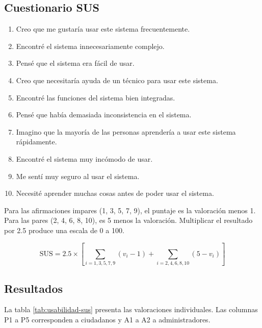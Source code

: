\subsection{Cuestionario SUS}

\begin{enumerate}[label=\textbf{\arabic*}.]
    \item Creo que me gustaría usar este sistema frecuentemente.
    \item Encontré el sistema innecesariamente complejo.
    \item Pensé que el sistema era fácil de usar.
    \item Creo que necesitaría ayuda de un técnico para usar este sistema.
    \item Encontré las funciones del sistema bien integradas.
    \item Pensé que había demasiada inconsistencia en el sistema.
    \item Imagino que la mayoría de las personas aprendería a usar este sistema rápidamente.
    \item Encontré el sistema muy incómodo de usar.
    \item Me sentí muy seguro al usar el sistema.
    \item Necesité aprender muchas cosas antes de poder usar el sistema.
\end{enumerate}

Para las afirmaciones impares (1, 3, 5, 7, 9), el puntaje es la valoración menos 1. Para las pares (2, 4, 6, 8, 10), es 5 menos la valoración. 
Multiplicar el resultado por 2.5 produce una escala de 0 a 100.

\[
\text{SUS} = 2.5 \times \left[ \sum_{i=1,3,5,7,9} (v_i - 1) + \sum_{i=2,4,6,8,10} (5 - v_i) \right]
\]

\subsection{Resultados}

La tabla \ref{tab:usabilidad-sus} presenta las valoraciones individuales. Las columnas P1 a P5 corresponden a ciudadanos y A1 a A2 a administradores.

